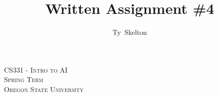 \documentclass[10pt,draftclsnofoot,onecolumn]{IEEEtran}
\begin{document}
\singlespacing %
\title{Written Assignment \#4}

\author{Ty~Skelton}

\maketitle

\begin{center}
\scshape                      %
CS331 - Intro to AI \\        %
Spring Term\\[\baselineskip]  %
Oregon State University\par   %
\end{center}

\IEEEpeerreviewmaketitle

\newpage
{}
\end{document}
